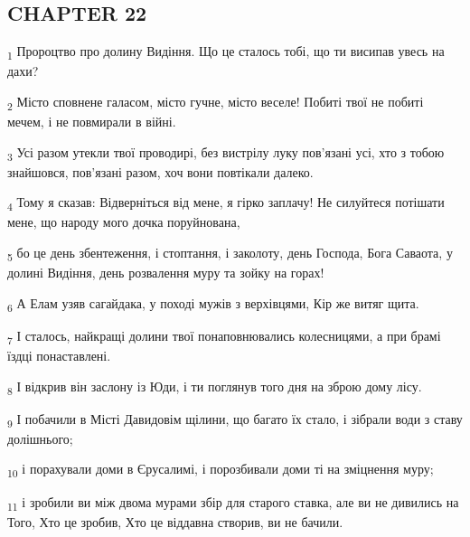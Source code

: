 \subsection{CHAPTER 22}
\begin{tcolorbox}
\textsubscript{1} Пророцтво про долину Видіння. Що це сталось тобі, що ти висипав увесь на дахи?
\end{tcolorbox}
\begin{tcolorbox}
\textsubscript{2} Місто сповнене галасом, місто гучне, місто веселе! Побиті твої не побиті мечем, і не повмирали в війні.
\end{tcolorbox}
\begin{tcolorbox}
\textsubscript{3} Усі разом утекли твої проводирі, без вистрілу луку пов'язані усі, хто з тобою знайшовся, пов'язані разом, хоч вони повтікали далеко.
\end{tcolorbox}
\begin{tcolorbox}
\textsubscript{4} Тому я сказав: Відверніться від мене, я гірко заплачу! Не силуйтеся потішати мене, що народу мого дочка поруйнована,
\end{tcolorbox}
\begin{tcolorbox}
\textsubscript{5} бо це день збентеження, і стоптання, і заколоту, день Господа, Бога Саваота, у долині Видіння, день розвалення муру та зойку на горах!
\end{tcolorbox}
\begin{tcolorbox}
\textsubscript{6} А Елам узяв сагайдака, у поході мужів з верхівцями, Кір же витяг щита.
\end{tcolorbox}
\begin{tcolorbox}
\textsubscript{7} І сталось, найкращі долини твої понаповнювались колесницями, а при брамі їздці понаставлені.
\end{tcolorbox}
\begin{tcolorbox}
\textsubscript{8} І відкрив він заслону із Юди, і ти поглянув того дня на зброю дому лісу.
\end{tcolorbox}
\begin{tcolorbox}
\textsubscript{9} І побачили в Місті Давидовім щілини, що багато їх стало, і зібрали води з ставу долішнього;
\end{tcolorbox}
\begin{tcolorbox}
\textsubscript{10} і порахували доми в Єрусалимі, і порозбивали доми ті на зміцнення муру;
\end{tcolorbox}
\begin{tcolorbox}
\textsubscript{11} і зробили ви між двома мурами збір для старого ставка, але ви не дивились на Того, Хто це зробив, Хто це віддавна створив, ви не бачили.
\end{tcolorbox}
